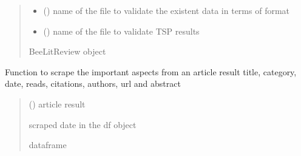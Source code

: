 \documentclass[letterpaper,10pt,english]{sphinxmanual}
\begin{document}
\begin{fulllineitems}
\begin{quote}
\begin{description}
\begin{itemize}
\item {} 
\sphinxAtStartPar
{} () \textendash{} name of the file to validate the existent data in terms of format

\item {} 
\sphinxAtStartPar
{} () \textendash{} name of the file to validate TSP results

\end{itemize}

\sphinxAtStartPar
BeeLitReview object

\sphinxAtStartPar
{\hyperref[\detokenize{BeeLitReview:BeeLitReview.BeeLitReview}]{}}

\end{description}\end{quote}

\begin{fulllineitems}
\label{\detokenize{BeeLitReview:BeeLitReview.BeeLitReview.article_scrape}}
\pysigstartsignatures
{}
\pysigstopsignatures
\sphinxAtStartPar
Function to scrape the important aspects from an article result \sphinxhyphen{} title, category, date, reads, citations, authors, url and abstract
\begin{quote}\begin{description}
\sphinxAtStartPar
{} () \textendash{} article result

\sphinxAtStartPar
scraped date in the df object

\sphinxAtStartPar
dataframe

\end{description}\end{quote}

\end{fulllineitems}



\end{fulllineitems}
\end{document}
